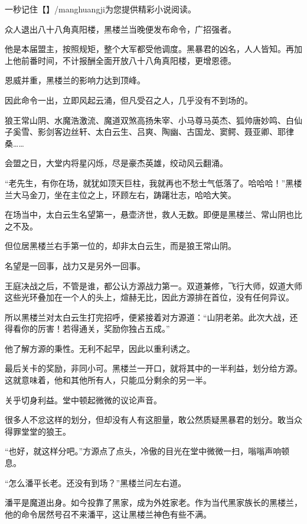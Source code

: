 
\begin{this_body}

一秒记住【】/manghuangji为您提供精彩小说阅读。

众人退出八十八角真阳楼，黑楼兰当晚便发布命令，广招强者。

他是本届盟主，按照规矩，整个大军都受他调度。黑暴君的凶名，人人皆知。再加上他前番时间，不计报酬全面开放八十八角真阳楼，更增恩德。

恩威并重，黑楼兰的影响力达到顶峰。

因此命令一出，立即风起云涌，但凡受召之人，几乎没有不到场的。

狼王常山阴、水魔浩激流、魔道双煞高扬朱宰、小马尊马英杰、狐帅唐妙鸣、白仙子奚雪、影剑客边丝轩、太白云生、吕爽、陶幽、古国龙、窦鳄、聂亚卿、耶律桑……

会盟之日，大堂内将星闪烁，尽是豪杰英雄，绞动风云翻涌。

“老先生，有你在场，就犹如顶天巨柱，我就再也不愁士气低落了。哈哈哈！”黑楼兰大马金刀，坐在主位之上，环顾左右，踌躇壮志，哈哈大笑。

在场当中，太白云生名望第一，悬壶济世，救人无数。即便是黑楼兰、常山阴也比之不及。

但位居黑楼兰右手第一位的，却非太白云生，而是狼王常山阴。

名望是一回事，战力又是另外一回事。

王庭决战之后，不管是谁，都公认方源战力第一。双道兼修，飞行大师，奴道大师这些光环叠加在一个人的头上，煊赫无比，因此方源排在首位，没有任何异议。

所以黑楼兰对太白云生打完招呼，便紧接着对方源道：“山阴老弟。此次大战，还得看你的厉害！若得通关，奖励你独占五成。”

他了解方源的秉性。无利不起早，因此以重利诱之。

最后关卡的奖励，非同小可。黑楼兰一开口，就将其中的一半利益，划分给方源。这就意味着，他和其他所有人，只能瓜分剩余的另一半。

关乎切身利益。堂中顿起微微的议论声音。

很多人不忿这样的划分，但却没有人有这胆量，敢公然质疑黑暴君的划分。敢当众得罪堂堂的狼王。

“也好，就这样分吧。”方源点了点头，冷傲的目光在堂中微微一扫，嗡嗡声响顿息。

“怎么潘平长老。还没有到场？”黑楼兰问左右道。

潘平是魔道出身。如今投靠了黑家，成为外姓家老。作为当代黑家族长的黑楼兰，他的命令居然号召不来潘平，这让黑楼兰神色有些不满。


\end{this_body}
